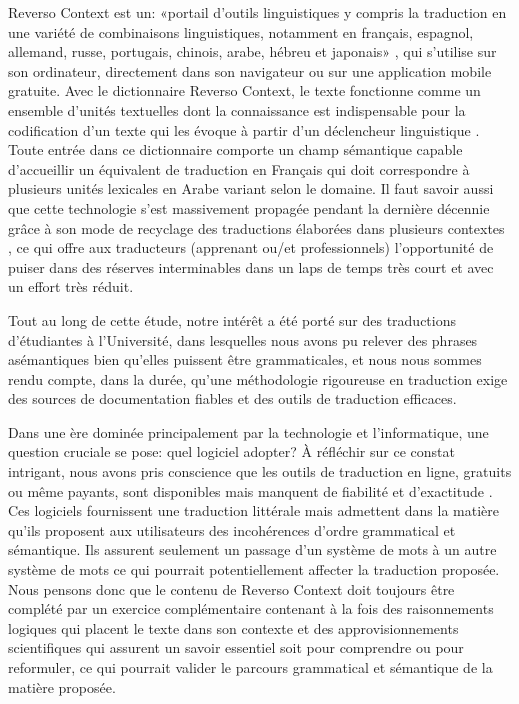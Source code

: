 \documentclass{textolivre}
\begin{document}
Reverso Context est un: «portail d’outils linguistiques y compris la traduction en une variété de combinaisons linguistiques, notamment en français, espagnol, allemand, russe, portugais, chinois, arabe, hébreu et japonais» \cite[p. 215]{segun2014}, qui s'utilise sur son ordinateur, directement dans son navigateur ou sur une application mobile gratuite. Avec le dictionnaire Reverso Context, le texte fonctionne comme un ensemble d’unités textuelles dont la connaissance est indispensable pour la codification d'un texte qui les évoque à partir d'un déclencheur linguistique \cite{blanco2001}. Toute entrée dans ce dictionnaire comporte un champ sémantique capable d’accueillir un équivalent de traduction en Français qui doit correspondre à plusieurs unités lexicales en Arabe variant selon le domaine. Il faut savoir aussi que cette technologie s’est massivement propagée pendant la dernière décennie grâce à son mode de recyclage des traductions élaborées dans plusieurs contextes \cite[p. 218]{guerberof2019}, ce qui offre aux traducteurs (apprenant ou/et professionnels) l’opportunité de puiser dans des réserves interminables dans un laps de temps très court et avec un effort très réduit.

Tout au long de cette étude, notre intérêt a été porté sur des traductions d’étudiantes à l’Université, dans lesquelles nous avons pu relever des phrases asémantiques bien qu’elles puissent être grammaticales, et nous nous sommes rendu compte, dans la durée, qu’une méthodologie rigoureuse en traduction exige des sources de documentation fiables et des outils de traduction efficaces.

Dans une ère dominée principalement par la technologie et l’informatique, une question cruciale se pose: quel logiciel adopter?
À réfléchir sur ce constat intrigant, nous avons pris conscience que les outils de traduction en ligne, gratuits ou même payants, sont disponibles mais manquent de fiabilité et d’exactitude \cite{segun2014}. Ces logiciels fournissent une traduction littérale mais admettent dans la matière qu’ils proposent aux utilisateurs des incohérences d’ordre grammatical et sémantique. Ils assurent seulement un passage d’un système de mots à un autre système de mots \cite[p. 213]{aubin1995} ce qui pourrait potentiellement affecter la traduction proposée. Nous pensons donc que le contenu de Reverso Context doit toujours être complété par un exercice complémentaire contenant à la fois des raisonnements logiques qui placent le texte dans son contexte et des approvisionnements scientifiques qui assurent un savoir essentiel soit pour comprendre ou pour reformuler, ce qui pourrait valider le parcours grammatical et sémantique de la matière proposée.
\end{document}
